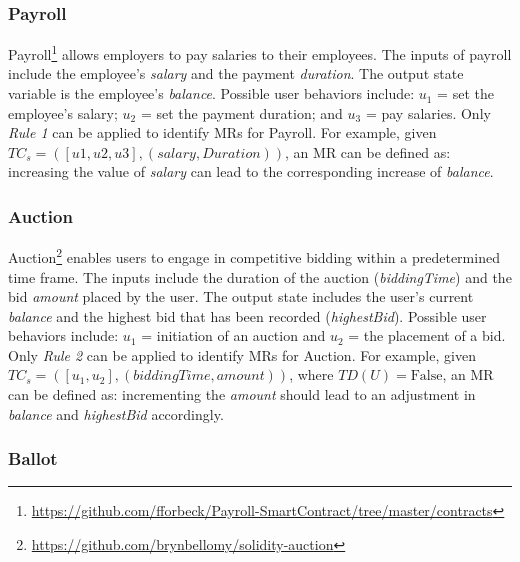 
\subsubsection{Payroll}

Payroll\footnote{\url{https://github.com/fforbeck/Payroll-SmartContract/tree/master/contracts}} allows employers to pay salaries to their employees. The inputs of payroll include the employee's \textit{salary} and the payment \textit{duration}. The output state variable is the employee's \textit{balance}. Possible user behaviors include: \(u_1\) = set the employee's salary; \(u_2\) = set the payment duration; and \(u_3\) = pay salaries. Only \textit{Rule 1} can be applied to identify MRs for Payroll. For example, given \(TC_s = ([u1, u2, u3], (salary, Duration))\), an MR can be defined as: increasing the value of \textit{salary} can lead to the corresponding increase of \textit{balance}.

\subsubsection{Auction}

Auction\footnote{\url{https://github.com/brynbellomy/solidity-auction}} enables users to engage in competitive bidding within a predetermined time frame. The inputs include the duration of the auction (\textit{biddingTime}) and the bid \textit{amount} placed by the user. The output state includes the user's current \textit{balance} and the highest bid that has been recorded (\textit{highestBid}). Possible user behaviors include: \(u_1\) = initiation of an auction and \(u_2\) = the placement of a bid. Only \textit{Rule 2} can be applied to identify MRs for Auction. For example, given \(TC_s = ([u_1, u_2], (biddingTime, amount))\), where \(TD(U) = \text{False}\), an MR can be defined as: incrementing the \textit{amount} should lead to an adjustment in \textit{balance} and \textit{highestBid} accordingly.

\subsubsection{Ballot}


